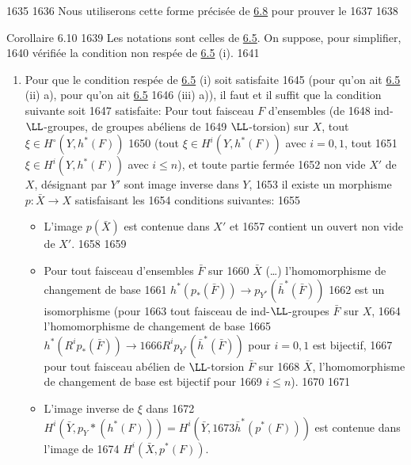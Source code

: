   1635	
  1636	Nous utiliserons cette forme précisée de \hyperref[XII.prop6.8]{6.8} pour prouver le
  1637	
  1638	\begin{enonce*}{Corollaire 6.10}
  1639	Les notations sont celles de \hyperref[XII.prop6.5]{6.5}. On suppose, pour simplifier,
  1640	vérifiée la condition non respée de {\rm \hyperref[XII.prop6.5]{6.5} (i)}.
  1641	\begin{enumerate}
  1642	\renewcommand{\theenumi}{\roman{enumi}}
  1643	\renewcommand{\labelenumi}{(\theenumi)}
  1644	\item Pour que le condition respée de {\rm \hyperref[XII.prop6.5]{6.5} (i)} soit satisfaite
  1645	(\resp pour qu'on ait {\rm \hyperref[XII.prop6.5]{6.5} (ii) a),} \resp pour qu'on ait {\rm \hyperref[XII.prop6.5]{6.5}
  1646	(iii) a))}, il faut et il suffit que la condition suivante soit
  1647	satisfaite: Pour tout faisceau $F$ d'ensembles (\resp de
  1648	ind-$\LL$-groupes, \resp de groupes abéliens de
  1649	$\LL$-torsion) sur $X$, tout $\xi\in H^{\circ}(Y,h^{\ast}(F))$
  1650	(\resp tout $\xi\in H^{i}(Y,h^{\ast}(F))$ avec $i=0,1$, \resp tout
  1651	$\xi \in H^{i}(Y,h^{\ast}(F))$ avec $i\leq n$), et toute partie fermée
  1652	non vide $X'$ de $X$, désignant par $Y'$ sont image inverse dans $Y$,
  1653	il existe un morphisme $p:\bar{X}\rightarrow X$ satisfaisant les
  1654	conditions suivantes:
  1655	\begin{itemize}
  1656	\item[$1^{\circ}$)] L'image $p(\bar{X})$ est contenue dans $X'$ et
  1657	contient un ouvert non vide de $X'$.
  1658	
  1659	\item[$2^{\circ}$)] Pour tout faisceau d'ensembles $\bar{F}$ sur
  1660	$\bar{X}$ (\resp\ldots) l'homomorphisme de changement de base
  1661	$h^{\ast}(p_{\ast}(\bar{F}))\rightarrow p_{Y^{\ast}}(\bar{h}^{\ast}(\bar{F}))$ 
  1662	est un isomorphisme (\resp pour
  1663	tout faisceau de ind-$\LL$-groupes $\bar{F}$ sur $X$,
  1664	l'homomorphisme de changement de base
  1665	$h^{\ast}(R^{i}p_{\ast}(\bar{F}))\rightarrow
  1666	R^{i}p_{Y^{\ast}}(\bar{h}^{\ast}(\bar{F}))$ pour $i=0,1$ est bijectif,
  1667	\resp pour tout faisceau abélien de $\LL$-torsion $\bar{F}$ sur
  1668	$\bar{X}$, l'homomorphisme de changement de base est bijectif pour
  1669	$i\leq n$).
  1670	
  1671	\item[$3^{\circ}$)] L'image inverse de $\xi$ dans
  1672	$H^{i}(\bar{Y},p_Y\ast(h^{\ast}(F)))=H^{i}(\bar{Y},
  1673	\bar{h}^{\ast}(p^{\ast}(F)))$ est contenue dans l'image de
  1674	$H^{i}(\bar{X},p^{\ast}(F))$.

\end{itemize}
\end{enumerate}
\end{enonce*}
